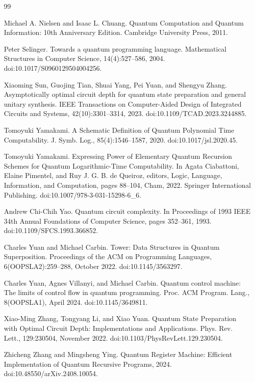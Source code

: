 \documentclass[10pt,a4paper]{amsart}
\begin{document}
\begin{thebibliography}{99}
\par\noindent  [26]  Michael A. Nielsen and Isaac L. Chuang.  Quantum Computation and Quantum Information: 10th Anniversary Edition.  Cambridge University Press, 2011.  
 
\par\noindent  [27]  Peter Selinger.  Towards a quantum programming language.  Mathematical Structures in Computer Science, 14(4):527–586, 2004.  doi:10.1017/S0960129504004256.  
 
\par\noindent  [28]  Xiaoming Sun, Guojing Tian, Shuai Yang, Pei Yuan, and Shengyu Zhang.  Asymptotically optimal circuit depth for quantum state preparation and general unitary synthesis.  IEEE Transactions on Computer-Aided Design of Integrated Circuits and Systems, 42(10):3301–3314, 2023.  doi:10.1109/TCAD.2023.3244885.  
 
\par\noindent  [29]  Tomoyuki Yamakami.  A Schematic Definition of Quantum Polynomial Time Computability.  J. Symb. Log., 85(4):1546–1587, 2020.  doi:10.1017/jsl.2020.45.  
 
\par\noindent  [30]  Tomoyuki Yamakami.  Expressing Power of Elementary Quantum Recursion Schemes for Quantum Logarithmic-Time Computability.  In Agata Ciabattoni, Elaine Pimentel, and Ruy J. G. B. de Queiroz, editors, Logic, Language, Information, and Computation, pages 88–104, Cham, 2022. Springer International Publishing.  doi:10.1007/978-3-031-15298-6\_6.  
 
\par\noindent  [31]  Andrew Chi-Chih Yao.  Quantum circuit complexity.  In Proceedings of 1993 IEEE 34th Annual Foundations of Computer Science, pages 352–361, 1993.  doi:10.1109/SFCS.1993.366852.  
 
\par\noindent  [32]  Charles Yuan and Michael Carbin.  Tower: Data Structures in Quantum Superposition.  Proceedings of the ACM on Programming Languages, 6(OOPSLA2):259–288, October 2022.  doi:10.1145/3563297.  
 
\par\noindent  [33]  Charles Yuan, Agnes Villanyi, and Michael Carbin.  Quantum control machine: The limits of control flow in quantum programming.  Proc. ACM Program. Lang., 8(OOPSLA1), April 2024.  doi:10.1145/3649811.  
 
\par\noindent  [34]  Xiao-Ming Zhang, Tongyang Li, and Xiao Yuan.  Quantum State Preparation with Optimal Circuit Depth: Implementations and Applications.  Phys. Rev. Lett., 129:230504, November 2022.  doi:10.1103/PhysRevLett.129.230504.  
 
\par\noindent  [35]  Zhicheng Zhang and Mingsheng Ying.  Quantum Register Machine: Efficient Implementation of Quantum Recursive Programs, 2024.  doi:10.48550/arXiv.2408.10054.  
  
\end{thebibliography}
\end{document}
